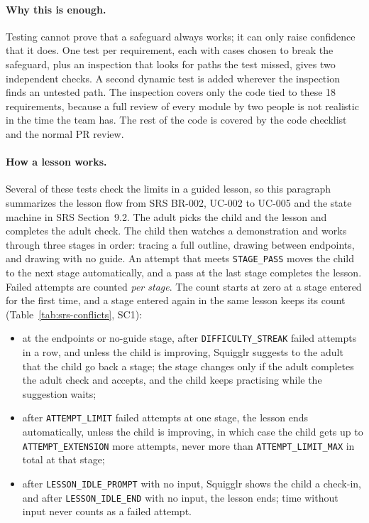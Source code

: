 \documentclass[12pt, titlepage]{article}
\begin{document}
\paragraph{Why this is enough.} Testing cannot prove that a safeguard always
works; it can only raise confidence that it does. One test per
requirement, each with cases chosen to break the safeguard, plus an
inspection that looks for paths the test missed, gives two independent
checks. A second dynamic test is added wherever the inspection finds an
untested path. The inspection covers only the code tied to these 18
requirements, because a full review of every module by two people is not
realistic in the time the team has. The rest of the code is covered by the
code checklist and the normal PR review.

\paragraph{How a lesson works.} Several of these tests check the limits in a
guided lesson, so this paragraph summarizes the lesson flow from SRS BR-002,
UC-002 to UC-005 and the state machine in SRS Section~9.2. The adult picks the
child and the lesson and completes the adult check. The child then watches a
demonstration and works through three stages in order: tracing a full
outline, drawing between endpoints, and drawing with no guide. An attempt
that meets \texttt{STAGE\_PASS} moves the child to the next stage
automatically, and a pass at the last stage completes the lesson. Failed
attempts are counted \emph{per stage}. The count starts at zero at a stage
entered for the first time, and a stage entered again in the same lesson
keeps its count (Table~\ref{tab:srs-conflicts}, SC1):
\begin{itemize}
\item at the endpoints or no-guide stage, after \texttt{DIFFICULTY\_STREAK}
failed attempts in a row, and unless the child is improving, Squigglr suggests
to the adult that the child go back a stage; the stage changes only
if the adult completes the adult check and accepts, and the child keeps
practising while the suggestion waits;
\item after \texttt{ATTEMPT\_LIMIT} failed attempts at one stage, the lesson
ends automatically, unless the child is improving, in which case the child
gets up to \texttt{ATTEMPT\_EXTENSION} more attempts, never more than
\texttt{ATTEMPT\_LIMIT\_MAX} in total at that stage;
\item after \texttt{LESSON\_IDLE\_PROMPT} with no input, Squigglr shows the
child a check-in, and after \texttt{LESSON\_IDLE\_END} with no input, the
lesson ends; time without input never counts as a failed attempt.
\end{itemize}
\end{document}
